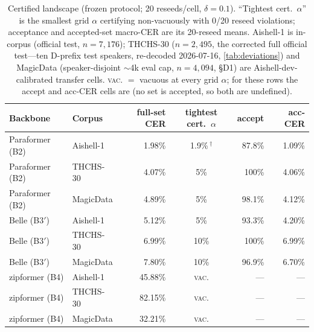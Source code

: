 \documentclass[11pt]{article}
\begin{document}
\begin{table}[t]
  \centering
  \caption{Certified landscape (frozen protocol; 20 reseeds/cell,
  $\delta{=}0.1$). ``Tightest cert.\ $\alpha$'' is the smallest grid $\alpha$ certifying
  non-vacuously with 0/20 reseed violations; acceptance and accepted-set macro-CER are its
  20-reseed means. Aishell-1 is in-corpus (official test, $n{=}7{,}176$); THCHS-30
  ($n{=}2{,}495$, the corrected full official test---ten D-prefix test speakers,
  re-decoded 2026-07-16, \cref{tab:deviations}) and MagicData (speaker-disjoint $\sim$4k
  eval cap, $n{=}4{,}094$, \S D1) are Aishell-dev-calibrated transfer cells.
  \textsc{vac.} $=$ vacuous at every grid $\alpha$; for these rows the accept and
  acc-CER cells are \textemdash{} (no set is accepted, so both are undefined).}
  \label{tab:landscape}
  \small
  \begin{tabular}{l l r c r r}
    \toprule
    Backbone & Corpus & full-set CER & tightest cert.\ $\alpha$ & accept & acc-CER \\
    \midrule
    Paraformer (B2)  & Aishell-1  & 1.98\%  & 1.9\%\,$^\dagger$ & 87.8\% & 1.09\% \\
    Paraformer (B2)  & THCHS-30   & 4.07\%  & 5\%   & 100\%  & 4.06\% \\
    Paraformer (B2)  & MagicData  & 4.89\%  & 5\%   & 98.1\% & 4.12\% \\
    Belle (B3$'$)    & Aishell-1  & 5.12\%  & 5\%   & 93.3\% & 4.20\% \\
    Belle (B3$'$)    & THCHS-30   & 6.99\%  & 10\%  & 100\%  & 6.99\% \\
    Belle (B3$'$)    & MagicData  & 7.80\%  & 10\%  & 96.9\% & 6.70\% \\
    zipformer (B4)   & Aishell-1  & 45.88\% & \textsc{vac.} & --- & --- \\
    zipformer (B4)   & THCHS-30   & 82.15\% & \textsc{vac.} & --- & --- \\
    zipformer (B4)   & MagicData  & 32.21\% & \textsc{vac.} & --- & --- \\
    \bottomrule
  \end{tabular}
\end{table}
\end{document}
